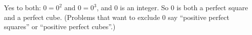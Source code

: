 Yes to both: $0=0^2$ and $0=0^3$, and $0$ is an integer. So $0$ is both a perfect square and a perfect cube. (Problems that want to exclude $0$ say ``positive perfect squares'' or ``positive perfect cubes''.)
